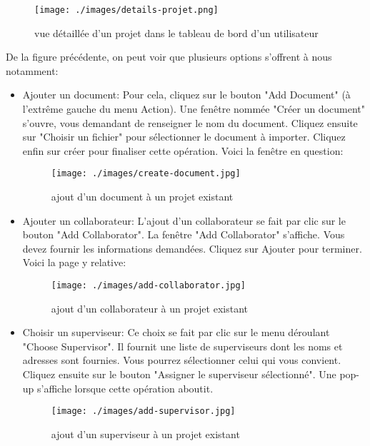 \documentclass[12pt]{article}
\begin{document}
\begin{figure}[h!]
    \centering
    \texttt{[image: ./images/details-projet.png]}
    \caption{vue détaillée d'un projet dans le tableau de bord d'un utilisateur}
    \label{fig:vue détaillée d'un projet chez un user}
\end{figure}

\medskip
De la figure précédente, on peut voir que plusieurs options s'offrent à nous notamment:
\begin{itemize}
    \item Ajouter un document: Pour cela, cliquez sur le bouton "Add Document" (à l'extrême gauche du menu Action). Une fenêtre nommée "Créer un document" s'ouvre, vous demandant de renseigner le nom du document. Cliquez ensuite sur "Choisir un fichier" pour sélectionner le document à importer. Cliquez enfin sur créer pour finaliser cette opération. Voici la fenêtre en question:
        \begin{figure}[h!]
            \centering
            \texttt{[image: ./images/create-document.jpg]}
            \caption{ajout d'un document à un projet existant}
            \label{fig:ajout d'un document pour un projet}
        \end{figure}
        
        \smallskip
        
    \item Ajouter un collaborateur: L'ajout d'un collaborateur se fait par clic sur le bouton "Add Collaborator". La fenêtre "Add Collaborator" s'affiche. Vous devez fournir les informations demandées. Cliquez sur Ajouter pour terminer. Voici la page y relative:
        \begin{figure}[h!]
            \centering
            \texttt{[image: ./images/add-collaborator.jpg]}
            \caption{ajout d'un collaborateur à un projet existant}
            \label{fig:ajout d'un collaborateur à un projet existant}
        \end{figure}
        
        \medskip

    \item Choisir un superviseur: Ce choix se fait par clic sur le menu déroulant "Choose Supervisor". Il fournit une liste de superviseurs dont les noms et adresses sont fournies. Vous pourrez sélectionner celui qui vous convient. Cliquez ensuite sur le bouton "Assigner le superviseur sélectionné". Une pop-up s'affiche lorsque cette opération aboutit.
        \begin{figure}[h!]
            \centering
            \texttt{[image: ./images/add-supervisor.jpg]}
            \caption{ajout d'un superviseur à un projet existant}
            \label{fig:ajout d'un superviseur à un projet existant}
        \end{figure}
        

\end{itemize}
\end{document}
